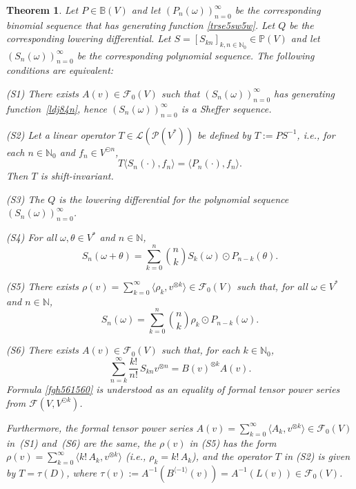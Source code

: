 \documentclass[12pt]{article}
\newtheorem{theorem}{Theorem}[section]
\theoremstyle{remark}
\theoremstyle{remark}
\theoremstyle{remark}
\begin{document}
\begin{theorem}\label{ctrst5u}
Let $P\in \mathbb B(V)$  and let $(P_n(\omega))_{n=0}^\infty$ be the corresponding binomial  sequence that has generating function \eqref{trse5sw5w}. Let $Q$ be the corresponding lowering differential.
Let $S=[S_{kn}]_{k,n\in\mathbb N_0}\in\mathbb P(V)$ and let $(S_n(\omega))_{n=0}^\infty$ be the corresponding polynomial  sequence.  The following conditions are equivalent:

{\rm (S1)} There exists  $A(v)\in \mathcal F_0(V)$ such that $(S_n(\omega))_{n=0}^\infty$ has generating function~\eqref{ldj84n}, hence $(S_n(\omega))_{n=0}^\infty$ is a Sheffer sequence.  

{\rm (S2)} Let a linear operator $T\in\mathcal L(\mathcal P(V^*))$ be defined by $T:=PS^{-1}$,
i.e.,  for each $n\in\mathbb N_0$ and $f_n\in V^{\odot n}$,
\begin{equation}T\langle S_n(\cdot),f_n\rangle=\langle P_n(\cdot),f_n\rangle.\label{2b3dh}\end{equation}
Then $T$ is shift-invariant.


{\rm (S3)} The $Q$ is the lowering differential  for the polynomial sequence $(S_n(\omega))_{n=0}^\infty$.

{\rm (S4)} For all $\omega,\theta \in V^*$  and $n\in \mathbb N$,
\begin{equation}\label{fgxtgxt}  S_n(\omega+\theta)=\sum_{k=0}^n {n \choose k}S_k(\omega)\odot P_{n-k}(\theta) .\end{equation}

{\rm (S5)} There exists $\rho(v)=\sum_{k=0}^\infty \langle \rho_k, v^{\otimes k}\rangle\in \mathcal F_0(V)$ such that, for all $\omega \in V^*$  and $n \in \mathbb N$,
\begin{equation}\label{guf6rd65s5}S_n(\omega) =\sum_{k=0}^n{n \choose k}
\rho_k\odot P_{n-k}(\omega).\end{equation}

{\rm (S6)} There exists $A(v)\in \mathcal F_0(V)$ such that, for each $k\in \mathbb N_0$, 
\begin{equation}\label{fgh561560}\sum_{n=k}^\infty \frac{k!}{n!}\,S_{kn}v^{\otimes n}= B(v)^{\otimes k}A(v).\end{equation}
Formula \eqref{fgh561560} is understood as an equality of formal tensor power series from $\mathcal F(V,V^{\odot k})$.

Furthermore, the formal tensor power series $A(v)=\sum_{k=0}^\infty\langle  A_k, v^{\otimes k}\rangle\in \mathcal F_0(V)$ in~{\rm (S1)} and~{\rm (S6)} are the same, the $\rho(v)$ in {\rm (S5)} has the form $\rho(v)=\sum_{k=0}^\infty \langle k!\, A_k, v^{\otimes k}\rangle$ (i.e., $\rho_k=k!\,A_k$), and the operator $T$ in {\rm (S2)} is given by 
$T=\tau(D)$, where $\tau(v):=A^{-1}(B^{\langle -1\rangle}(v))=A^{-1}(L(v))\in\mathcal F_0(V)$.
\end{theorem}
\end{document}
